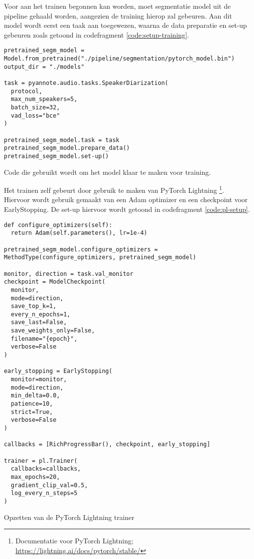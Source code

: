 Voor aan het trainen begonnen kan worden, moet segmentatie model uit de pipeline gehaald worden, aangezien de training hierop zal gebeuren. Aan dit model wordt eerst een taak aan toegewezen, waarna de data preparatie en set-up gebeuren zoals getoond in codefragment \ref{code:setup-training}.

\begin{listing}
	\begin{verbatim}
pretrained_segm_model = Model.from_pretrained("./pipeline/segmentation/pytorch_model.bin")
output_dir = "./models"

task = pyannote.audio.tasks.SpeakerDiarization(
  protocol,
  max_num_speakers=5,
  batch_size=32,
  vad_loss="bce"
)

pretrained_segm_model.task = task
pretrained_segm_model.prepare_data()
pretrained_segm_model.set-up()
	\end{verbatim}
	\caption[Model klaarmaken voor training]{\label{code:setup-training}Code die gebruikt wordt om het model klaar te maken voor training.}
\end{listing}

Het trainen zelf gebeurt door gebruik te maken van PyTorch Lightning \footnote{Documentatie voor PyTorch Lightning; \url{https://lightning.ai/docs/pytorch/stable/}}. Hiervoor wordt gebruik gemaakt van een Adam optimizer en een checkpoint voor EarlyStopping. De set-up hiervoor wordt getoond in codefragment \ref{code:pl-setup}.

\begin{listing}
	\begin{verbatim}
def configure_optimizers(self):
  return Adam(self.parameters(), lr=1e-4)
    
pretrained_segm_model.configure_optimizers = MethodType(configure_optimizers, pretrained_segm_model)

monitor, direction = task.val_monitor
checkpoint = ModelCheckpoint(
  monitor,
  mode=direction,
  save_top_k=1,
  every_n_epochs=1,
  save_last=False,
  save_weights_only=False,
  filename="{epoch}",
  verbose=False
)

early_stopping = EarlyStopping(
  monitor=monitor,
  mode=direction,
  min_delta=0.0,
  patience=10,
  strict=True,
  verbose=False
)

callbacks = [RichProgressBar(), checkpoint, early_stopping]

trainer = pl.Trainer(
  callbacks=callbacks,
  max_epochs=20,
  gradient_clip_val=0.5,
  log_every_n_steps=5
)
	\end{verbatim}
	\caption[PyTorch Lightning set-up]{\label{code:pl-setup}Opzetten van de PyTorch Lightning trainer}
\end{listing}

